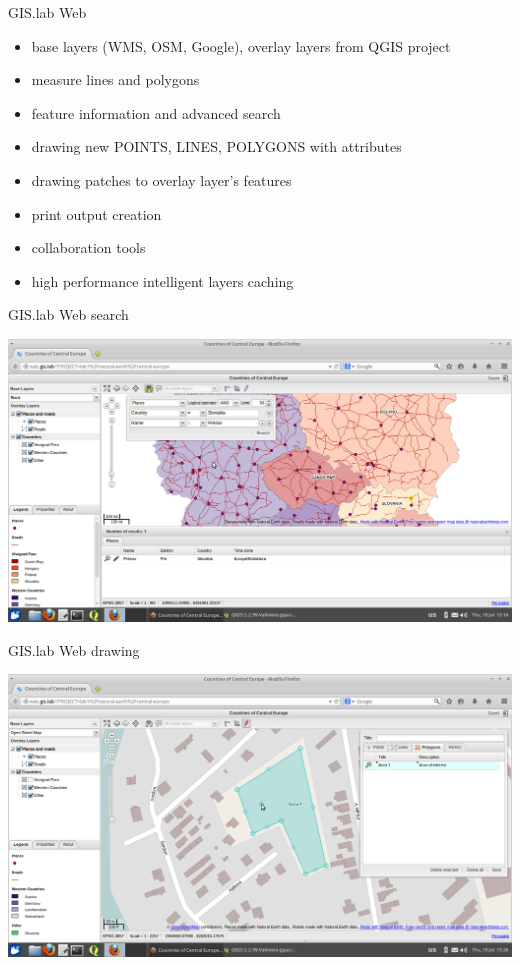 \documentclass[12pt]{beamer}
\begin{document}
\begin{frame}{GIS.lab Web}
	\begin{itemize}[<+->]
		\item base layers (WMS, OSM, Google), overlay layers from QGIS project
		\item measure lines and polygons
		\item feature information and advanced search
		\item drawing new POINTS, LINES, POLYGONS with attributes
		\item drawing patches to overlay layer's features
		\item print output creation
		\item collaboration tools
		\item high performance intelligent layers caching
	\end{itemize}
\end{frame}


\begin{frame}{GIS.lab Web search}
	\begin{center}
		\includegraphics[keepaspectratio=true,height=0.7\textheight]{images/rapid-gis-deployment/project-gislab-web-search.png}
	\end{center}
\end{frame}


\begin{frame}{GIS.lab Web drawing}
	\begin{center}
		\includegraphics[keepaspectratio=true,height=0.7\textheight]{images/rapid-gis-deployment/project-gislab-web-drawing.png}
	\end{center}
\end{frame}
\end{document}
